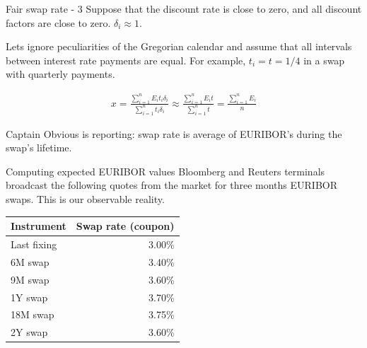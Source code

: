 \documentclass{beamer}
\begin{document}
\begin{frame}{Fair swap rate - 3}
\justify
Suppose that the discount rate is close to zero, and all discount factors are close to zero. $\delta_i \approx1$.

\justify
Lets ignore peculiarities of the Gregorian calendar and assume that all intervals between interest rate payments are equal. For example, $t_i = t = 1/4$ in a swap with quarterly payments.

\begin{align*}
x = \frac{\sum\limits_{i=1}^{n} E_i t_i \delta_i}{\sum\limits_{i=1}^{n} t_i \delta_i}
\approx
\frac{\sum\limits_{i=1}^{n} E_i t}{\sum\limits_{i=1}^{n} t}
=
\frac{\sum\limits_{i=1}^{n} E_i}{n}
\end{align*}

\justify
Captain Obvious is reporting: swap rate is average of EURIBOR's during the swap's lifetime.
\end{frame}



\begin{frame}{Computing expected EURIBOR values}
\justify
Bloomberg and Reuters terminals broadcast the following quotes from the market for three months EURIBOR swaps. This is our observable reality.

\justify
\centering
\begin{tabular}{l|r}
Instrument        & Swap rate (coupon) \\ \hline
Last fixing & 3.00\% \\
6M swap           & 3.40\% \\
9M swap           & 3.60\% \\
1Y swap           & 3.70\% \\
18M swap          & 3.75\% \\
2Y swap           & 3.60\%
\end{tabular}

\end{frame}
\end{document}
